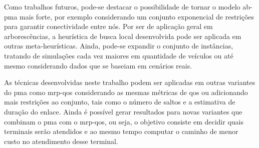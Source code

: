 Como  trabalhos futuros,  pode-se destacar  o possibilidade  de tornar  o modelo
\gls{ab-pma} mais  forte, por  exemplo considerando  um conjunto  exponencial de
restrições para garantir conectividade entre nós.  Por ser de aplicação geral em
arborescências, a  heurística de busca  local desenvolvida pode ser  aplicada em
outras  meta-heurísticas.  Ainda, pode-se  expandir  o  conjunto de  instâncias,
tratando de simulações  cada vez maiores em quantidade de  veículos ou até mesmo
considerando dados que se baseiam em cenários reais.

As técnicas desenvolvidas neste trabalho podem ser aplicadas em outras variantes
do \gls{pma} como \gls{mrp-qos} considerando  as mesmas métricas de \gls{qos} ou
adicionando  mais restrições  ao conjunto,  tais  como o  número de  saltos e  a
estimativa de  duração do enlace. Ainda  é possível gerar resultados  para novas
variantes que  combinam o  \gls{pma} com  o \gls{mrp-qos},  ou seja,  o objetivo
consiste em decidir quais terminais serão  atendidos e ao mesmo tempo computar o
caminho de menor custo no atendimento desse terminal.




